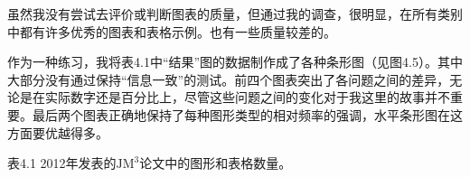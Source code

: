 虽然我没有尝试去评价或判断图表的质量，但通过我的调查，很明显，在所有类别中都有许多优秀的图表和表格示例。也有一些质量较差的。

作为一种练习，我将表4.1中“结果”图的数据制作成了各种条形图（见图4.5）。其中大部分没有通过保持“信息一致”的测试。前四个图表突出了各问题之间的差异，无论是在实际数字还是百分比上，尽管这些问题之间的变化对于我这里的故事并不重要。最后两个图表正确地保持了每种图形类型的相对频率的强调，水平条形图在这方面要优越得多。

表4.1 2012年发表的$\mathrm{JM}^{3}$论文中的图形和表格数量。

